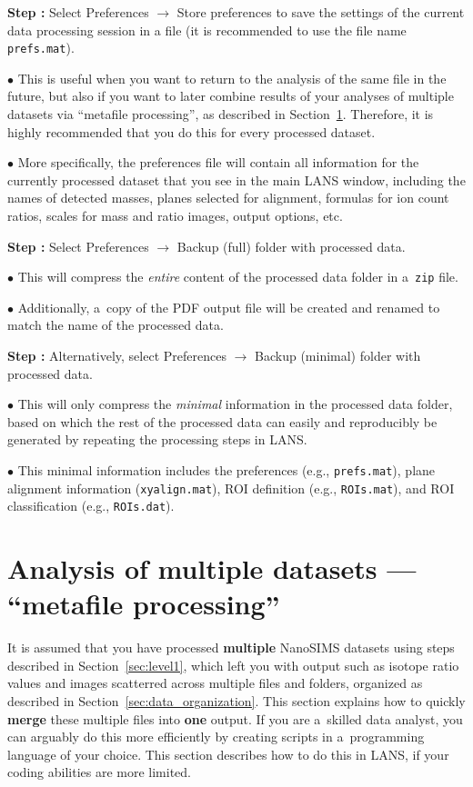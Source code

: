 \documentclass[a4paper, 11pt]{article}
\newcommand{\ttt}[1]{\texttt{#1}}
\newcommand{\lans}[1]{{\color{magenta}#1}}
\newcommand\ra{\rightarrow}
\newcounter{step}
\newcommand\s{\addtocounter{step}{1}\vskip5pt\noindent\textbf{Step \thestep:}{ }}
\newcommand\bul{\vskip5pt\noindent$\bullet${ }}
\newcommand\bb[1]{\textbf{#1}}
\begin{document}
\s Select \lans{Preferences} $\ra$ \lans{Store preferences} to save the settings of the current data processing session in a file (it is recommended to use the file name \ttt{prefs.mat}). 

\bul This is useful when you want to return to the analysis of the same file in the future, but also if you want to later combine results of your analyses of multiple datasets via ``metafile processing'', as described in Section~\ref{sec:level2}. Therefore, it is highly recommended that you do this for every processed dataset.

\bul More specifically, the preferences file will contain all information for the currently processed dataset that you see in the main LANS window, including the names of detected masses, planes selected for alignment, formulas for ion count ratios, scales for mass and ratio images, output options, etc.

\s Select \lans{Preferences} $\ra$ \lans{Backup (full) folder with processed data}.

\bul This will compress the \emph{entire} content of the processed data folder in a~\ttt{zip} file.

\bul Additionally, a~copy of the PDF output file will be created and renamed to match the name of the processed data.

\s Alternatively, select \lans{Preferences} $\ra$ \lans{Backup (minimal) folder with processed data}.

\bul This will only compress the \emph{minimal} information in the processed data folder, based on which the rest of the processed data can easily and reproducibly be generated by repeating the processing steps in LANS. 

\bul This minimal information includes the preferences (e.g., \ttt{prefs.mat}), plane alignment information (\ttt{xyalign.mat}), ROI definition (e.g., \ttt{ROIs.mat}), and ROI classification (e.g., \ttt{ROIs.dat}).


\section{Analysis of multiple datasets --- ``metafile processing''}
\label{sec:level2}

It is assumed that you have processed \bb{multiple} NanoSIMS datasets using steps described in Section~\ref{sec:level1}, which left you with output such as isotope ratio values and images scatterred across multiple files and folders, organized as described in Section~\ref{sec:data_organization}. This section explains how to quickly \bb{merge} these multiple files into \bb{one} output. If you are a~skilled data analyst, you can arguably do this more efficiently by creating scripts in a~programming language of your choice. This section describes how to do this in LANS, if your coding abilities are more limited.
\end{document}
